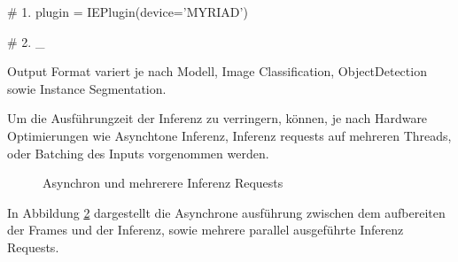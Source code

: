 \begin{figure}[htb]
    \centering
    
    \caption{}
    \label{}
\end{figure}



\begin{python}
    # 1.
    plugin = IEPlugin(device='MYRIAD')

    # 2.
    {\_}






\end{python}


Output Format variert je nach Modell, Image Classification,
ObjectDetection sowie Instance Segmentation.


Um die Ausführungzeit der Inferenz zu verringern, können, 
je nach Hardware Optimierungen wie Asynchtone Inferenz, 
Inferenz requests auf mehreren Threads, oder Batching des 
Inputs vorgenommen werden.

\begin{figure}[htb]
    \centering
    \def\svgwidth{0.7\textwidth}
    
    \caption{Asynchron und mehrerere Inferenz Requests}
    \label{fig:async}
\end{figure}

In Abbildung \ref{fig:async} dargestellt die Asynchrone ausführung 
zwischen dem aufbereiten der Frames und der Inferenz, sowie 
mehrere parallel ausgeführte Inferenz Requests.

